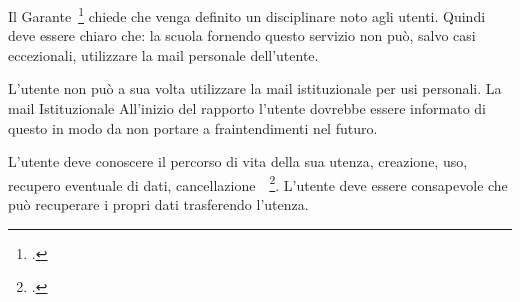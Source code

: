 Il Garante~\footcite{Garante2007} chiede che 
venga definito un disciplinare noto agli utenti. Quindi deve essere chiaro che:
la scuola fornendo questo servizio non può, salvo casi eccezionali, utilizzare 
la mail personale dell'utente.

L'utente non può a sua volta utilizzare la mail istituzionale per  usi  
personali. La mail Istituzionale  All'inizio del rapporto l'utente dovrebbe essere informato di questo 
in modo da non portare a fraintendimenti nel futuro.

L'utente deve conoscere il percorso di vita della sua utenza, creazione, uso, 
recupero eventuale di dati, 
cancellazione~~\footcite{Garante2019}. L'utente deve 
essere consapevole che 
può recuperare i propri dati trasferendo l'utenza. 